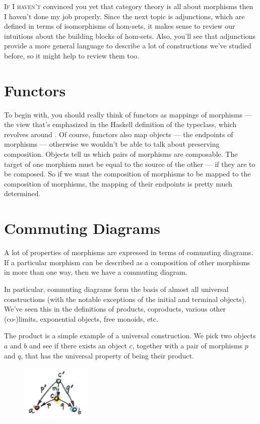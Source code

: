 
\lettrine[lhang=0.17]{I}{f I haven't} convinced you yet that category theory is all about
morphisms then I haven't done my job properly. Since the next topic is
adjunctions, which are defined in terms of isomorphisms of hom-sets, it
makes sense to review our intuitions about the building blocks of
hom-sets. Also, you'll see that adjunctions provide a more general
language to describe a lot of constructions we've studied before, so it
might help to review them too.

\section{Functors}

To begin with, you should really think of functors as mappings of
morphisms --- the view that's emphasized in the Haskell definition of
the  typeclass, which revolves around . Of
course, functors also map objects --- the endpoints of morphisms ---
otherwise we wouldn't be able to talk about preserving composition.
Objects tell us which pairs of morphisms are composable. The target of
one morphism must be equal to the source of the other --- if they are to
be composed. So if we want the composition of morphisms to be mapped to
the composition of  morphisms, the mapping of their
endpoints is pretty much determined.

\section{Commuting Diagrams}

A lot of properties of morphisms are expressed in terms of commuting
diagrams. If a particular morphism can be described as a composition of
other morphisms in more than one way, then we have a commuting diagram.

In particular, commuting diagrams form the basis of almost all universal
constructions (with the notable exceptions of the initial and terminal
objects). We've seen this in the definitions of products, coproducts,
various other (co-)limits, exponential objects, free monoids, etc.

The product is a simple example of a universal construction. We pick two
objects $a$ and $b$ and see if there exists an object
$c$, together with a pair of morphisms $p$ and $q$,
that has the universal property of being their product.

\begin{figure}[H]
\centering
\includegraphics[width=0.3\textwidth]{images/productranking.jpg}
\end{figure}

